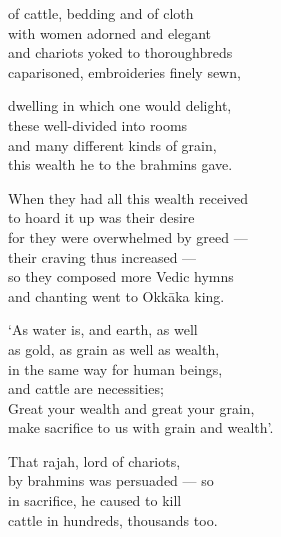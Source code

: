 \begin{MyDescription}{}
of cattle, bedding and of cloth\\
with women adorned and elegant\\
and chariots yoked to thoroughbreds\\
caparisoned, embroideries ﬁnely sewn,
\end{MyDescription}  

\begin{MyDescription}{}
dwelling in which one would delight,\\
these well-divided into rooms\\
and many different kinds of grain,\\
this wealth he to the brahmins gave.
\end{MyDescription}  

\begin{MyDescription}{}
When they had all this wealth received\\
to hoard it up was their desire\\
for they were overwhelmed by greed —\\
their craving thus increased —\\
so they composed more Vedic hymns\\
and chanting went to Okk\=aka king.
\end{MyDescription}  


\begin{MyDescription}{}
`As water is, and earth, as well\\
as gold, as grain as well as wealth,\\
in the same way for human beings,\\
and cattle are necessities;\\
Great your wealth and great your grain,\\
make sacriﬁce to us with grain and wealth'.
\end{MyDescription}  

\begin{MyDescription}{}
That rajah, lord of chariots,\\
by brahmins was persuaded — so\\
in sacrifice, he caused to kill\\
cattle in hundreds, thousands too.
\end{MyDescription}  

